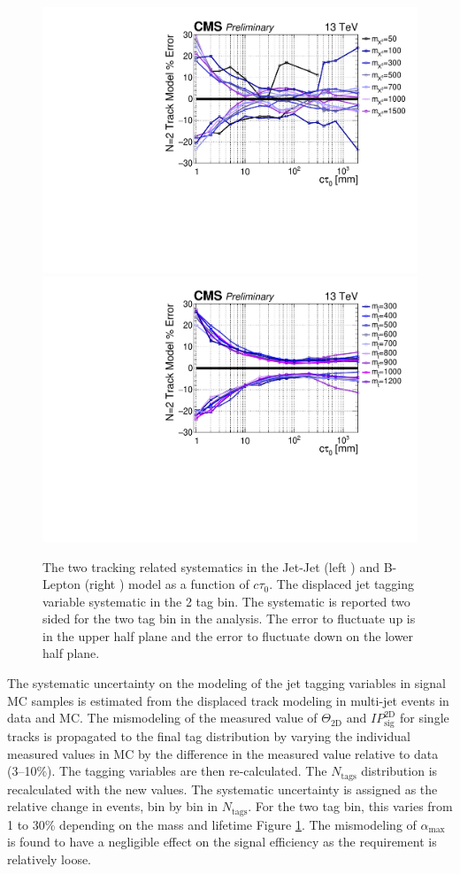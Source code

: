 \begin{figure}
\begin{center}
\includegraphics[width=.45\textwidth]{figures/an/SYSTEMATICS/76x_pu/sys_2tag_tracking.pdf}
\includegraphics[width=.45\textwidth]{figures/an/SYSTEMATICS/76x_pu/sys_2tag_tracking_dsusy.pdf}
\caption{The two tracking related systematics in the Jet-Jet (left ) and B-Lepton
 (right )  model as a function of $c\tau_0$.  The displaced jet tagging variable 
systematic in the 2 tag bin. The systematic is reported two sided for the two tag
 bin in the analysis. The error to fluctuate up is in the upper half plane and the
 error to fluctuate down on the lower half plane.  \label{fig:offline_tracking_sys}}
\end{center}
\end{figure}

The systematic uncertainty on the modeling of the jet tagging
variables in signal MC samples is estimated from the displaced track
modeling in multi-jet events in data and MC. The mismodeling of the
measured value of $\Theta_{\textrm{2D}}$ and $IP_{\textrm{sig}}^{\textrm{2D}}$ for
single tracks is propagated to the final tag distribution by varying
the individual measured values in MC by the difference in the measured
value relative to data (3--10\%). The tagging variables are then
re-calculated.  The $N_{\textrm{tags}}$ distribution is recalculated
with the new values. The systematic uncertainty is assigned as the
relative change in events, bin by bin in $N_{\textrm{tags}}$. For the
two tag bin, this varies from 1 to 30\% depending on the mass and
lifetime Figure \ref{fig:offline_tracking_sys}. The mismodeling of
 $\alpha_{\textrm{max}}$ is found to have a negligible effect on the
 signal efficiency as the requirement is relatively loose.

